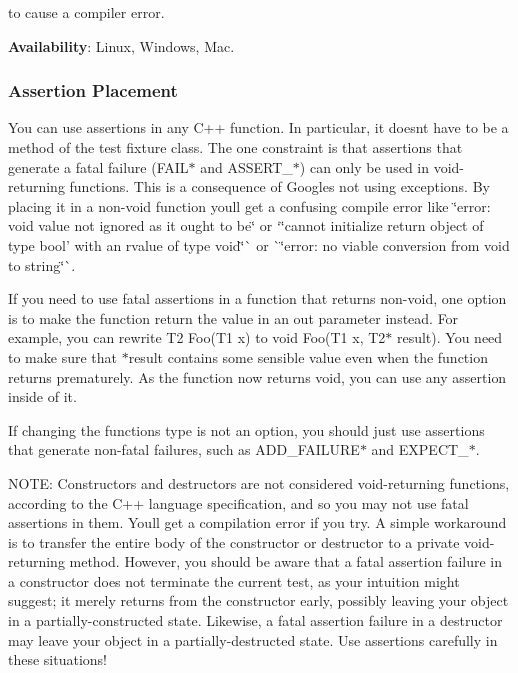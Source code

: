 to cause a compiler error.

{\bfseries{Availability}}\+: Linux, Windows, Mac.

\subsubsection*{Assertion Placement}

You can use assertions in any C++ function. In particular, it doesn\textquotesingle{}t have to be a method of the test fixture class. The one constraint is that assertions that generate a fatal failure ({\ttfamily F\+A\+I\+L$\ast$} and {\ttfamily A\+S\+S\+E\+R\+T\+\_\+$\ast$}) can only be used in void-\/returning functions. This is a consequence of Google\textquotesingle{}s not using exceptions. By placing it in a non-\/void function you\textquotesingle{}ll get a confusing compile error like {\ttfamily \char`\"{}error\+: void value not ignored as it ought to be\char`\"{}} or `\char`\"{}cannot
initialize return object of type \textquotesingle{}bool' with an rvalue of type \textquotesingle{}void\textquotesingle{}\char`\"{}\`{} or \`{}\char`\"{}error\+: no viable conversion from \textquotesingle{}void\textquotesingle{} to \textquotesingle{}string\textquotesingle{}\char`\"{}\`{}.

If you need to use fatal assertions in a function that returns non-\/void, one option is to make the function return the value in an out parameter instead. For example, you can rewrite {\ttfamily T2 Foo(\+T1 x)} to {\ttfamily void Foo(\+T1 x, T2$\ast$ result)}. You need to make sure that {\ttfamily $\ast$result} contains some sensible value even when the function returns prematurely. As the function now returns {\ttfamily void}, you can use any assertion inside of it.

If changing the function\textquotesingle{}s type is not an option, you should just use assertions that generate non-\/fatal failures, such as {\ttfamily A\+D\+D\+\_\+\+F\+A\+I\+L\+U\+R\+E$\ast$} and {\ttfamily E\+X\+P\+E\+C\+T\+\_\+$\ast$}.

N\+O\+TE\+: Constructors and destructors are not considered void-\/returning functions, according to the C++ language specification, and so you may not use fatal assertions in them. You\textquotesingle{}ll get a compilation error if you try. A simple workaround is to transfer the entire body of the constructor or destructor to a private void-\/returning method. However, you should be aware that a fatal assertion failure in a constructor does not terminate the current test, as your intuition might suggest; it merely returns from the constructor early, possibly leaving your object in a partially-\/constructed state. Likewise, a fatal assertion failure in a destructor may leave your object in a partially-\/destructed state. Use assertions carefully in these situations!

